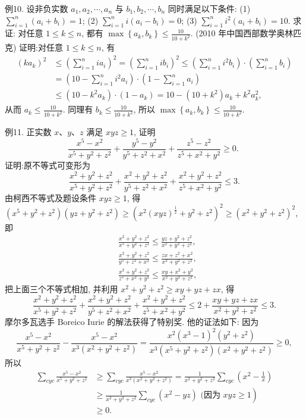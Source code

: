 例10. 设非负实数 $a_1, a_2, \cdots, a_n$ 与 $b_1, b_2, \cdots, b_n$ 同时满足以下条件:
(1) $\sum_{i=1}^n\left(a_i+b_i\right)=1$;
(2) $\sum_{i=1}^n i\left(a_i-b_i\right)=0$;
(3) $\sum_{i=1}^n i^2\left(a_i+b_i\right)=10$.
求证: 对任意 $1 \leqslant k \leqslant n$, 都有 $\max \left\{a_k, b_k\right\} \leqslant \frac{10}{10+k^2}$. (2010 年中国西部数学奥林匹克)
证明:对任意 $1 \leqslant k \leqslant n$, 有
$$
\begin{aligned}
\left(k a_k\right)^2 & \leqslant\left(\sum_{i=1}^n i a_i\right)^2=\left(\sum_{i=1}^n i b_i\right)^2 \leqslant\left(\sum_{i=1}^n i^2 b_i\right) \cdot\left(\sum_{i=1}^n b_i\right) \\
& =\left(10-\sum_{i=1}^n i^2 a_i\right) \cdot\left(1-\sum_{i=1}^n a_i\right) \\
& \leqslant\left(10-k^2 a_k\right) \cdot\left(1-a_k\right)=10-\left(10+k^2\right) a_k+k^2 a_k^2,
\end{aligned}
$$
从而 $a_k \leqslant \frac{10}{10+k^2}$.
同理有 $b_k \leqslant \frac{10}{10+k^2}$, 所以 $\max \left\{a_k, b_k\right\} \leqslant \frac{10}{10+k^2}$.



例11. 正实数 $x 、 y 、 z$ 满足 $x y z \geqslant 1$, 证明
$$
\frac{x^5-x^2}{x^5+y^2+z^2}+\frac{y^5-y^2}{y^5+z^2+x^2}+\frac{z^5-z^2}{z^5+x^2+y^2} \geqslant 0 \text {. }
$$
证明:原不等式可变形为
$$
\frac{x^2+y^2+z^2}{x^5+y^2+z^2}+\frac{x^2+y^2+z^2}{y^5+z^2+x^2}+\frac{x^2+y^2+z^2}{z^5+x^2+y^2} \leqslant 3 .
$$
由柯西不等式及题设条件 $x y z \geqslant 1$, 得
$\left(x^5+y^2+z^2\right)\left(y z+y^2+z^2\right) \geqslant\left(x^2(x y z)^{\frac{1}{2}}+y^2+z^2\right)^2 \geqslant\left(x^2+y^2+z^2\right)^2$, 即
$$
\begin{aligned}
& \frac{x^2+y^2+z^2}{x^5+y^2+z^2} \leqslant \frac{y z+y^2+z^2}{x^2+y^2+z^2}, \\
& \frac{x^2+y^2+z^2}{y^5+z^2+x^2} \leqslant \frac{z x+z^2+x^2}{x^2+y^2+z^2}, \\
& \frac{x^2+y^2+z^2}{z^5+x^2+y^2} \leqslant \frac{x y+x^2+y^2}{x^2+y^2+z^2},
\end{aligned}
$$
把上面三个不等式相加, 并利用 $x^2+y^2+z^2 \geqslant x y+y z+z x$, 得
$$
\frac{x^2+y^2+z^2}{x^5+y^2+z^2}+\frac{x^2+y^2+z^2}{y^5+z^2+x^2}+\frac{x^2+y^2+z^2}{z^5+x^2+y^2} \leqslant 2+\frac{x y+y z+z x}{x^2+y^2+z^2} \leqslant 3 .
$$
摩尔多瓦选手 Boreico Iurie 的解法获得了特别奖.
他的证法如下: 因为
$$
\frac{x^5-x^2}{x^5+y^2+z^2}-\frac{x^5-x^2}{x^3\left(x^2+y^2+z^2\right)}=\frac{x^2\left(x^3-1\right)^2\left(y^2+z^2\right)}{x^3\left(x^5+y^2+z^2\right)\left(x^2+y^2+z^2\right)} \geqslant 0,
$$
所以
$$
\begin{aligned}
\sum_{c y c} \frac{x^5-x^2}{x^5+y^2+z^2} & \geqslant \sum_{c y c} \frac{x^5-x^2}{x^3\left(x^2+y^2+z^2\right)}=\frac{1}{x^2+y^2+z^2} \sum_{c y c}\left(x^2-\frac{1}{x}\right) \\
& \left.\geqslant \frac{1}{x^2+y^2+z^2} \sum_{c y c}\left(x^2-y z\right) \text { (因为 } x y z \geqslant 1\right) \\
& \geqslant 0 .
\end{aligned}
$$



